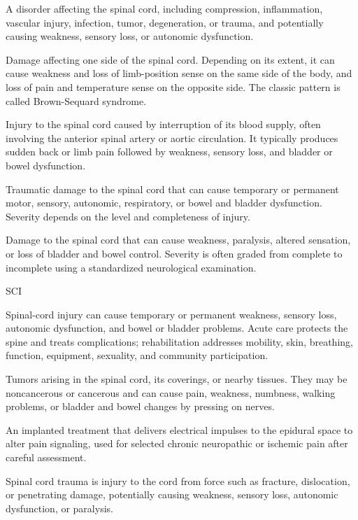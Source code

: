  A disorder affecting the spinal cord, including compression, inflammation, vascular injury, infection, tumor, degeneration, or trauma, and potentially causing weakness, sensory loss, or autonomic dysfunction.

 Damage affecting one side of the spinal cord. Depending on its extent, it can cause weakness and loss of limb-position sense on the same side of the body, and loss of pain and temperature sense on the opposite side. The classic pattern is called Brown-Sequard syndrome.

 Injury to the spinal cord caused by interruption of its blood supply, often involving the anterior spinal artery or aortic circulation. It typically produces sudden back or limb pain followed by weakness, sensory loss, and bladder or bowel dysfunction.

 Traumatic damage to the spinal cord that can cause temporary or permanent motor, sensory, autonomic, respiratory, or bowel and bladder dysfunction. Severity depends on the level and completeness of injury.

 Damage to the spinal cord that can cause weakness, paralysis, altered sensation, or loss of bladder and bowel control. Severity is often graded from complete to incomplete using a standardized neurological examination.

\synonyms
SCI

 Spinal-cord injury can cause temporary or permanent weakness, sensory loss, autonomic dysfunction, and bowel or bladder problems. Acute care protects the spine and treats complications; rehabilitation addresses mobility, skin, breathing, function, equipment, sexuality, and community participation.

 Tumors arising in the spinal cord, its coverings, or nearby tissues. They may be noncancerous or cancerous and can cause pain, weakness, numbness, walking problems, or bladder and bowel changes by pressing on nerves.

 An implanted treatment that delivers electrical impulses to the epidural space to alter pain signaling, used for selected chronic neuropathic or ischemic pain after careful assessment.

 Spinal cord trauma is injury to the cord from force such as fracture, dislocation, or penetrating damage, potentially causing weakness, sensory loss, autonomic dysfunction, or paralysis.

